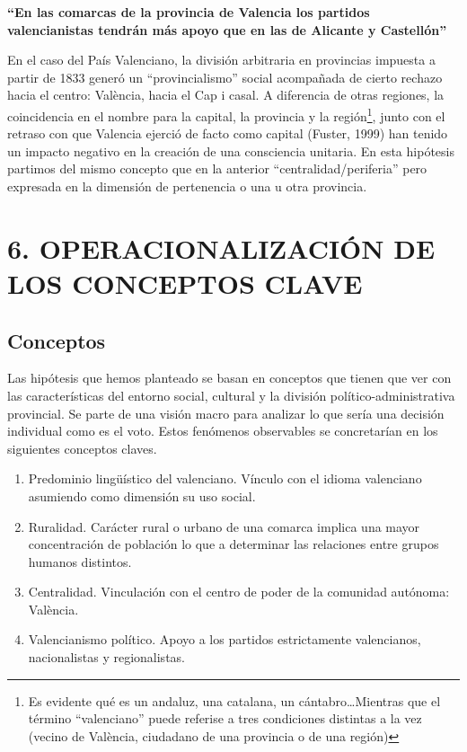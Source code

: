 \documentclass[
]{article}
\providecommand{\tightlist}{%
  \setlength{\itemsep}{0pt}\setlength{\parskip}{0pt}}
\begin{document}
\textbf{``En las comarcas de la provincia de Valencia los partidos
valencianistas tendrán más apoyo que en las de Alicante y Castellón''}

En el caso del País Valenciano, la división arbitraria en provincias
impuesta a partir de 1833 generó un ``provincialismo'' social acompañada
de cierto rechazo hacia el centro: València, hacia el Cap i casal. A
diferencia de otras regiones, la coincidencia en el nombre para la
capital, la provincia y la región\footnote{Es evidente qué es un
  andaluz, una catalana, un cántabro\ldots Mientras que el término
  ``valenciano'' puede referise a tres condiciones distintas a la vez
  (vecino de València, ciudadano de una provincia o de una región)},
junto con el retraso con que Valencia ejerció de facto como capital
(Fuster, 1999) han tenido un impacto negativo en la creación de una
consciencia unitaria. En esta hipótesis partimos del mismo concepto que
en la anterior ``centralidad/periferia'' pero expresada en la dimensión
de pertenencia o una u otra provincia.

\hypertarget{operacionalizaciuxf3n-de-los-conceptos-clave}{%
\section{6. OPERACIONALIZACIÓN DE LOS CONCEPTOS
CLAVE}\label{operacionalizaciuxf3n-de-los-conceptos-clave}}

\hypertarget{conceptos}{%
\subsection{Conceptos}\label{conceptos}}

Las hipótesis que hemos planteado se basan en conceptos que tienen que
ver con las características del entorno social, cultural y la división
político-administrativa provincial. Se parte de una visión macro para
analizar lo que sería una decisión individual como es el voto. Estos
fenómenos observables se concretarían en los siguientes conceptos
claves.

\begin{enumerate}
\def\labelenumi{\arabic{enumi}.}
\tightlist
\item
  Predominio lingüístico del valenciano. Vínculo con el idioma
  valenciano asumiendo como dimensión su uso social.
\item
  Ruralidad. Carácter rural o urbano de una comarca implica una mayor
  concentración de población lo que a determinar las relaciones entre
  grupos humanos distintos.
\item
  Centralidad. Vinculación con el centro de poder de la comunidad
  autónoma: València.
\item
  Valencianismo político. Apoyo a los partidos estrictamente
  valencianos, nacionalistas y regionalistas.
\end{enumerate}
\end{document}
